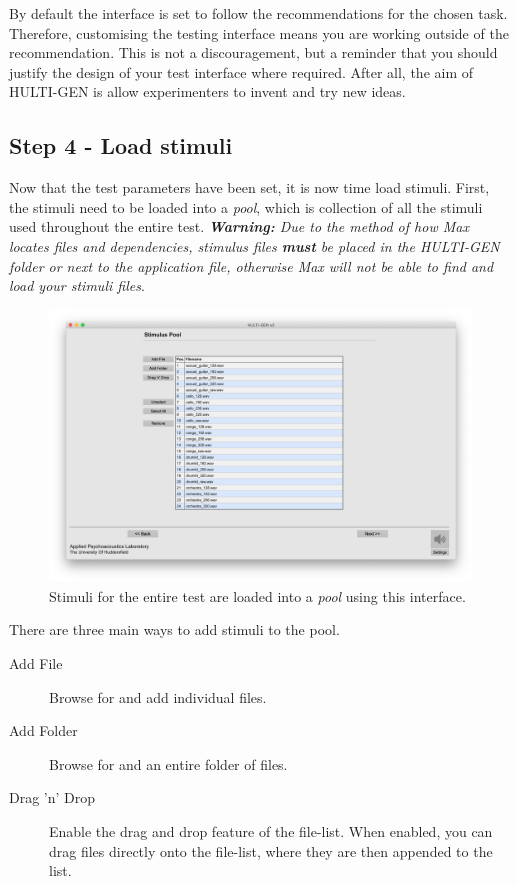 \noindent
By default the interface is set to follow the recommendations for the chosen task. Therefore, customising the testing interface means you are working outside of the recommendation. This is not a discouragement, but a reminder that you should justify the design of your test interface where required. After all, the aim of HULTI-GEN is allow experimenters to invent and try new ideas.

\subsection{Step 4 - Load stimuli}
Now that the test parameters have been set, it is now time load stimuli. First, the stimuli need to be loaded into a \emph{pool}, which is collection of all the stimuli used throughout the entire test.
\newline\newline
\textit{\textbf{Warning:} Due to the method of how Max locates files and dependencies, stimulus files \textbf{must} be placed in the HULTI-GEN folder or next to the application file, otherwise Max will not be able to find and load your stimuli files}.

\begin{figure}[ht]
	\centering
	\includegraphics[width=1.0\textwidth]{./images/createTest_step05_stimulusPool.png}
	\caption{Stimuli for the entire test are loaded into a \emph{pool} using this interface.}
	\label{create::stimulusPool}
\end{figure}

\noindent
There are three main ways to add stimuli to the pool.
\begin{description}
	\item[Add File] Browse for and add individual files.
	\item[Add Folder] Browse for and an entire folder of files.
	\item[Drag 'n' Drop] Enable the drag and drop feature of the file-list. When enabled, you can drag files directly onto the file-list, where they are then appended to the list.
\end{description}

